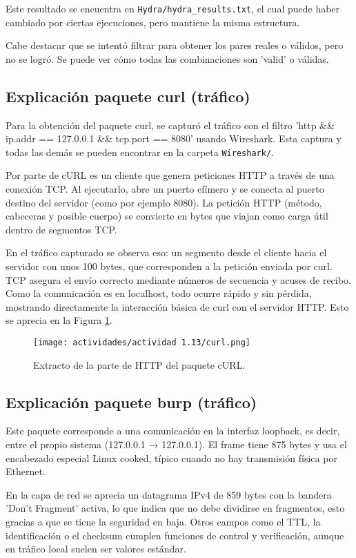 \documentclass[letter,12pt]{article}
\begin{document}
Este resultado se encuentra en \verb|Hydra/hydra_results.txt|, el cual puede haber cambiado por ciertas ejecuciones, pero mantiene la misma estructura.

Cabe destacar que se intentó filtrar para obtener los pares reales o válidos, pero no se logró. Se puede ver cómo todas las combinaciones son 'valid' o válidas.

\subsection{Explicación paquete curl (tráfico)}
Para la obtención del paquete curl, se capturó el tráfico con el filtro 'http \&\& ip.addr == 127.0.0.1 \&\& tcp.port == 8080' usando Wireshark. Esta captura y todas las demás se pueden encontrar en la carpeta \verb|Wireshark/|. 

Por parte de cURL es un cliente que genera peticiones HTTP a través de una conexión TCP. Al ejecutarlo, abre un puerto efímero y se conecta al puerto destino del servidor (como por ejemplo 8080). La petición HTTP (método, cabeceras y posible cuerpo) se convierte en bytes que viajan como carga útil dentro de segmentos TCP.

En el tráfico capturado se observa eso: un segmento desde el cliente hacia el servidor con unos 100 bytes, que corresponden a la petición enviada por curl. TCP asegura el envío correcto mediante números de secuencia y acuses de recibo. Como la comunicación es en localhost, todo ocurre rápido y sin pérdida, mostrando directamente la interacción básica de curl con el servidor HTTP. Esto se aprecia en la Figura \ref{actividad 1.13 curl}.

\begin{figure}[H]
    \centering
    \texttt{[image: actividades/actividad 1.13/curl.png]}
    \caption{Extracto de la parte de HTTP del paquete cURL.}
    \label{actividad 1.13 curl}
\end{figure}

\subsection{Explicación paquete burp (tráfico)}
Este paquete corresponde a una comunicación en la interfaz loopback, es decir, entre el propio sistema (127.0.0.1 → 127.0.0.1). El frame tiene 875 bytes y usa el encabezado especial Linux cooked, típico cuando no hay transmisión física por Ethernet.

En la capa de red se aprecia un datagrama IPv4 de 859 bytes con la bandera 'Don’t Fragment' activa, lo que indica que no debe dividirse en fragmentos, esto gracias a que se tiene la seguridad en baja. Otros campos como el TTL, la identificación o el checksum cumplen funciones de control y verificación, aunque en tráfico local suelen ser valores estándar.
\end{document}
